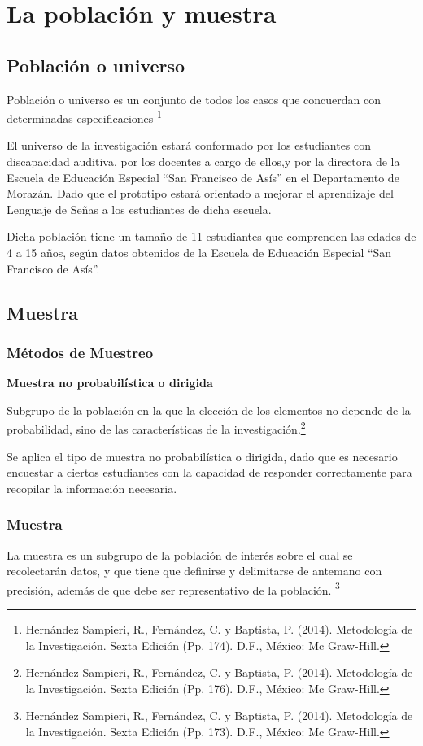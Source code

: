 \documentclass[12pt]{report}%
\begin{document}
\newpage
\section{La población y muestra}
\subsection{Población o universo }
Población o universo es un conjunto de todos los casos que concuerdan con determinadas especificaciones \footnote{Hernández Sampieri, R., Fernández, C. y  Baptista, P. (2014). Metodología de la Investigación. Sexta Edición (Pp. 174). D.F., México: Mc Graw-Hill.}

El universo de la investigación estará conformado por los estudiantes con discapacidad auditiva, por los docentes a cargo de ellos,y por la directora de la Escuela de Educación Especial “San Francisco de Asís” en el Departamento de Morazán. Dado que el prototipo estará orientado a mejorar el aprendizaje del Lenguaje de Señas a los estudiantes de dicha escuela.

Dicha población tiene un tamaño de 11 estudiantes que comprenden las edades de 4 a 15 años, según datos obtenidos de la Escuela de Educación Especial “San Francisco de Asís”.
\subsection{Muestra}
\subsubsection{Métodos de Muestreo }
\textbf{ Muestra no probabilística o dirigida}

Subgrupo de la población en la que la elección de los elementos no depende de la probabilidad, sino de las características de la investigación.\footnote{Hernández Sampieri, R., Fernández, C. y  Baptista, P. (2014). Metodología de la Investigación. Sexta Edición (Pp. 176). D.F., México: Mc Graw-Hill.}

Se aplica el tipo de muestra no probabilística o dirigida, dado que es necesario encuestar a ciertos estudiantes con la capacidad de responder correctamente para recopilar la información necesaria.

\subsubsection{Muestra}
La muestra es un subgrupo de la población de interés sobre el cual se recolectarán datos, y que tiene que definirse y delimitarse de antemano con precisión, además de que debe ser representativo de la población. \footnote{Hernández Sampieri, R., Fernández, C. y  Baptista, P. (2014). Metodología de la Investigación. Sexta Edición (Pp. 173). D.F., México: Mc Graw-Hill.}
\end{document}

